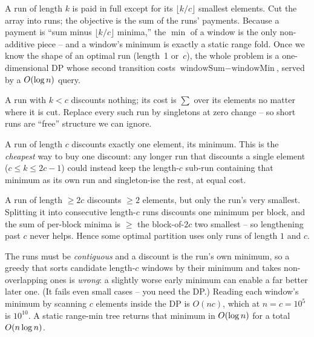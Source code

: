 A run of length \(k\) is paid in full except for its \(\lfloor k/c\rfloor\)
smallest elements.  Cut the array into runs; the objective is the sum of the
runs' payments.  Because a payment is ``sum minus \(\lfloor k/c\rfloor\) minima,''
the \(\min\) of a window is the only non-additive piece -- and a window's minimum
is exactly a static range fold.  Once we know the shape of an optimal run
(length~1 or~\(c\)), the whole problem is a one-dimensional DP whose second
transition costs \(\text{windowSum}-\text{windowMin}\), served by a
\(O(\log n)\) query.

\begin{observation}
A run with \(k<c\) discounts nothing; its cost is \(\sum\) over its elements no
matter where it is cut.  Replace every such run by singletons at zero change --
so short runs are ``free'' structure we can ignore.
\end{observation}
\begin{observation}
A run of length \(c\) discounts exactly one element, its minimum.  This is the
\emph{cheapest} way to buy one discount: any longer run that discounts a single
element (\(c\le k\le 2c{-}1\)) could instead keep the length-\(c\) sub-run
containing that minimum as its own run and singleton-ise the rest, at equal cost.
\end{observation}
\begin{observation}
A run of length \(\ge 2c\) discounts \(\ge2\) elements, but only the run's very
smallest.  Splitting it into consecutive length-\(c\) runs discounts one minimum
per block, and the sum of per-block minima is \(\ge\) the block-of-\(2c\) two
smallest -- so lengthening past \(c\) never helps.  Hence some optimal partition
uses only runs of length \(1\) and \(c\).
\end{observation}

\begin{thinkbox}
{The runs must be \emph{contiguous} and a discount is the run's own minimum, so a
greedy that sorts candidate length-\(c\) windows by their minimum and takes
non-overlapping ones is \emph{wrong}: a slightly worse early minimum can enable a
far better later one.  (It fails even small cases -- you need the DP.)}
{Reading each window's minimum by scanning \(c\) elements inside the DP is
\(O(nc)\), which at \(n=c=10^5\) is \(10^{10}\).  A static range-min tree returns
that minimum in \(O(\log n)\) for a total \(O(n\log n)\).}
\end{thinkbox}

